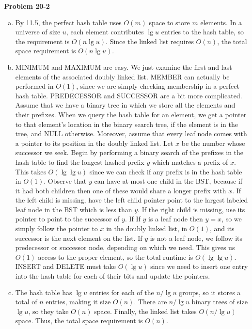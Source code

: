 \documentclass{article}
\begin{document}
\noindent\textbf{Problem 20-2}\\
\begin{enumerate}[a)]
\item By 11.5, the perfect hash table uses $O(m)$ space to store $m$ elements.  In a universe of size $u$, each element contributes $\lg u$ entries to the hash table, so the requirement is $O(n\lg u)$.  Since the linked list requires $O(n)$, the total space requirement is $O(n\lg u)$. 

\item MINIMUM and MAXIMUM are easy.  We just examine the first and last elements of the associated doubly linked list. MEMBER can actually be performed in $O(1)$, since we are simply checking membership in a perfect hash table.  PREDECESSOR and SUCCESSOR are a bit more complicated.  Assume that we have a binary tree in which we store all the elements and their prefixes.  When we query the hash table for an element, we get a pointer to that element's location in the binary search tree, if the element is in the tree, and NULL otherwise. Moreover, assume that every leaf node comes with a pointer to its position in the doubly linked list.  Let $x$ be the number whose successor we seek.  Begin by performing a binary search of the prefixes in the hash table to find the longest hashed prefix $y$ which matches a prefix of $x$.  This takes $O(\lg \lg u)$ since we can check if any prefix is in the hash table in $O(1)$. Observe that $y$ can have at most one child in the BST, because if it had both children then one of these would share a longer prefix with $x$.  If the left child is missing, have the left child pointer point to the largest labeled leaf node in the BST which is less than $y$. If the right child is missing, use its pointer to point to the successor of $y$.  If If $y$ is a leaf node then $y=x$, so we simply follow the pointer to $x$ in the doubly linked list, in $O(1)$, and its successor is the next element on the list.  If $y$ is not a leaf node,  we follow its predecessor or successor node, depending on which we need.  This gives us $O(1)$ access to the proper element, so the total runtime is $O(\lg \lg u)$.  INSERT and DELETE must take $O(\lg u)$ since we need to insert one entry into the hash table for each of their bits and update the pointers.  

\item The hash table has $\lg u$ entries for each of the $n/\lg u$ groups, so it stores a total of $n$ entries, making it size $O(n)$.  There are $n/\lg u$ binary trees of size $\lg u$, so they take $O(n)$ space.  Finally, the linked list takes $O(n/\lg u)$ space.  Thus, the total space requirement is $O(n)$. 


\end{enumerate}
\end{document}

